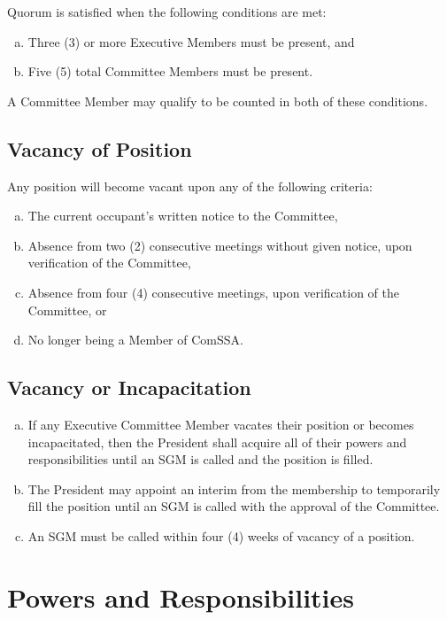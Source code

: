\documentclass[a4paper,12pt]{article}
\begin{document}
Quorum is satisfied when the following conditions are met:

\begin{enumerate}[a)]
	\item Three (3) or more Executive Members must be present, and
	\item Five (5) total Committee Members must be present.
\end{enumerate}

A Committee Member may qualify to be counted in both of these conditions.

\subsection{Vacancy of Position}

Any position will become vacant upon any of the following criteria:

\begin{enumerate}[a)]
	\item The current occupant's written notice to the Committee,
	\item Absence from two (2) consecutive meetings without given notice, upon verification of the Committee,
	\item Absence from four (4) consecutive meetings, upon verification of the Committee, or
	\item No longer being a Member of ComSSA.
\end{enumerate}

\subsection{Vacancy or Incapacitation}

\begin{enumerate}[a)]
	\item If any Executive Committee Member vacates their position or becomes incapacitated, then the President shall acquire all of their powers and responsibilities until an SGM is called and the position is filled.
	\item The President may appoint an interim from the membership to temporarily fill the position until an SGM is called with the approval of the Committee.
	\item An SGM must be called within four (4) weeks of vacancy of a position.
\end{enumerate}

\section{Powers and Responsibilities}
\end{document}
